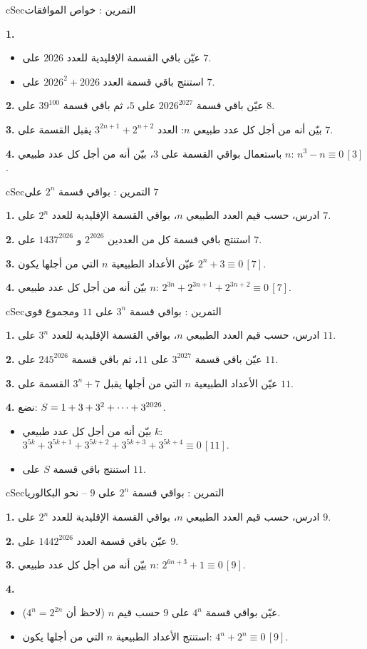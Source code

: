 \documentclass[12pt,a4paper]{article}
\newenvironment{BOX}[2]{\begin{otherlanguage}{english}\begin{arbox}{#1}{#2}}{\end{arbox}\end{otherlanguage}}
\newcounter{exo}
\newenvironment{tamrin}[1]{\stepcounter{exo}\begin{BOX}{cSec}{التمرين \theexo: #1}}{\end{BOX}}
\renewcommand{\cdots}{\mathinner{\cdotp\cdotp\cdotp}}
\newenvironment{sq}{\begin{itemize}[leftmargin=2.4em,itemsep=3pt]}{\end{itemize}}
\newcommand{\qa}{\item[(أ)]}\newcommand{\qb}{\item[(ب)]}\newcommand{\qc}{\item[(جـ)]}\newcommand{\qd}{\item[(د)]}\newcommand{\qe}{\item[(هـ)]}
\newcommand{\QQ}[1]{\par\smallskip\textbf{#1.} }
\begin{document}
\begin{tamrin}{خواص الموافقات}
\QQ{1}
\begin{sq}
\qa عيّن باقي القسمة الإقليدية للعدد $2026$ على $7$.
\qb استنتج باقي قسمة العدد $2026^2+2026$ على $7$.
\end{sq}
\QQ{2} عيّن باقي قسمة $2026^{2027}$ على $5$، ثم باقي قسمة $39^{100}$ على $8$.
\QQ{3} بيّن أنه من أجل كل عدد طبيعي $n$: العدد $3^{2n+1}+2^{n+2}$ يقبل القسمة على $7$.
\QQ{4} باستعمال بواقي القسمة على $3$، بيّن أنه من أجل كل عدد طبيعي $n$: $n^3-n\equiv 0\,[3]$.
\end{tamrin}

\begin{tamrin}{بواقي قسمة $2^n$ على $7$}
\QQ{1} ادرس، حسب قيم العدد الطبيعي $n$، بواقي القسمة الإقليدية للعدد $2^n$ على $7$.
\QQ{2} استنتج باقي قسمة كل من العددين $2^{2026}$ و $1437^{2026}$ على $7$.
\QQ{3} عيّن الأعداد الطبيعية $n$ التي من أجلها يكون $2^n+3\equiv 0\,[7]$.
\QQ{4} بيّن أنه من أجل كل عدد طبيعي $n$: $2^{3n}+2^{3n+1}+2^{3n+2}\equiv 0\,[7]$.
\end{tamrin}

\begin{tamrin}{بواقي قسمة $3^n$ على $11$ ومجموع قوى}
\QQ{1} ادرس، حسب قيم العدد الطبيعي $n$، بواقي القسمة الإقليدية للعدد $3^n$ على $11$.
\QQ{2} عيّن باقي قسمة $3^{2027}$ على $11$، ثم باقي قسمة $245^{2026}$ على $11$.
\QQ{3} عيّن الأعداد الطبيعية $n$ التي من أجلها يقبل $3^n+7$ القسمة على $11$.
\QQ{4} نضع: $S=1+3+3^2+\cdots+3^{2026}$.
\begin{sq}
\qa بيّن أنه من أجل كل عدد طبيعي $k$: $3^{5k}+3^{5k+1}+3^{5k+2}+3^{5k+3}+3^{5k+4}\equiv 0\,[11]$.
\qb استنتج باقي قسمة $S$ على $11$.
\end{sq}
\end{tamrin}

\begin{tamrin}{بواقي قسمة $2^n$ على $9$ -- نحو البكالوريا}
\QQ{1} ادرس، حسب قيم العدد الطبيعي $n$، بواقي القسمة الإقليدية للعدد $2^n$ على $9$.
\QQ{2} عيّن باقي قسمة العدد $1442^{2026}$ على $9$.
\QQ{3} بيّن أنه من أجل كل عدد طبيعي $n$: $2^{6n+3}+1\equiv 0\,[9]$.
\QQ{4}
\begin{sq}
\qa عيّن بواقي قسمة $4^n$ على $9$ حسب قيم $n$ (لاحظ أن $4^n=2^{2n}$).
\qb استنتج الأعداد الطبيعية $n$ التي من أجلها يكون: $4^n+2^n\equiv 0\,[9]$.
\end{sq}
\end{tamrin}
\end{document}
